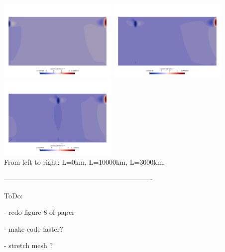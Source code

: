 \begin{center}
\includegraphics[width=5.7cm]{python_codes/fieldstone_143/results/fig9/v0000}
\includegraphics[width=5.7cm]{python_codes/fieldstone_143/results/fig9/v1000}
\includegraphics[width=5.7cm]{python_codes/fieldstone_143/results/fig9/v3000}\\
{\captionfont From left to right: L=0km, L=10000km, L=3000km.}
\end{center}

----------------------------------------------------------------

ToDo:

- redo figure 8 of paper

- make code faster?

- stretch mesh ?







